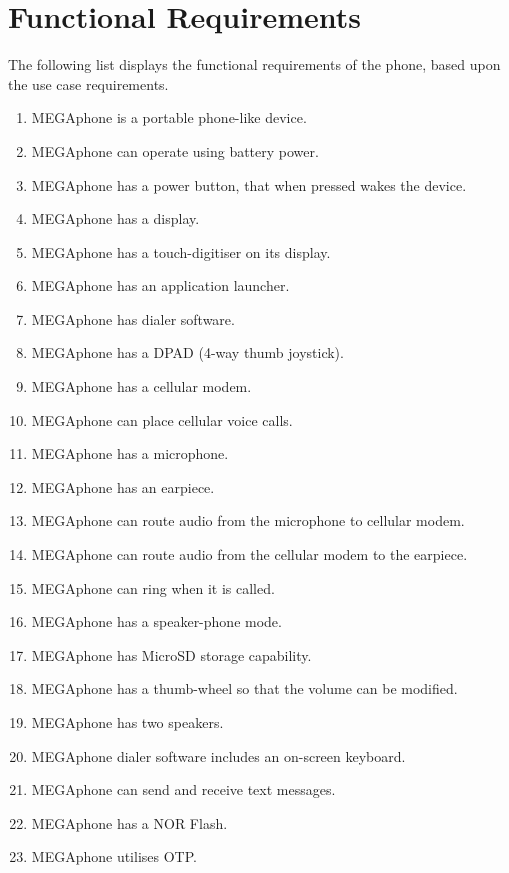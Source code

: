 \section{Functional Requirements}
	\label{funqreq}
	The following list displays the functional requirements of the phone, based upon the use case requirements.\\
	\begin{enumerate}[label=\roman{*})]
        \item  MEGAphone is a portable phone-like device.\label{item:portphone}
        \item  MEGAphone can operate using battery power.\label{item:batt}
        \item  MEGAphone has a power button, that when pressed wakes the device. \label{item:power}
        \item  MEGAphone has a display. \label{item:display}
        \item  MEGAphone has a touch-digitiser on its display. \label{item:digitiser}
        \item  MEGAphone has an application launcher.\label{item:launcher}
        \item  MEGAphone has dialer software.\label{item:dialer}
        \item  MEGAphone has a DPAD (4-way thumb joystick).\label{item:DPAD}
        \item  MEGAphone has a cellular modem.\label{item:cell}
        \item  MEGAphone can place cellular voice calls.\label{item:cell_voice}
        \item  MEGAphone has a microphone. \label{item:mic}
        \item  MEGAphone has an earpiece.\label{item:ear}
        \item  MEGAphone can route audio from the microphone to cellular modem.\label{item:audio_mic}
        \item  MEGAphone can route audio from the cellular modem to the earpiece.\label{item:audio_cell}
        \item  MEGAphone can ring when it is called.\label{item:ring}
        \item  MEGAphone has a speaker-phone mode.\label{item:speaker-phone}
	\item  MEGAphone has MicroSD storage capability.\label{item:SD}
	\item  MEGAphone has a thumb-wheel so that the volume can be modified.\label{item:wheel}
	\item  MEGAphone has two speakers.\label{item:speaker}
	\item  MEGAphone dialer software includes an on-screen keyboard.\label{item:key}
	\item  MEGAphone can send and receive text messages.\label{item:text}
	\item  MEGAphone has a NOR Flash.\label{item:NOR}
	\item  MEGAphone utilises OTP.\label{item:OTP}
	\end{enumerate}
